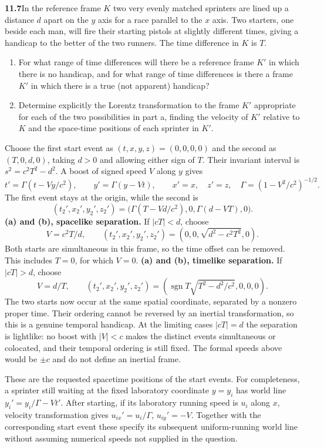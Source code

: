 \par\bigskip
\noindent\textbf{11.7}\quad In the reference frame $K$ two very evenly matched sprinters are lined up a distance $d$ apart on the $y$ axis for a race parallel to the $x$ axis. Two starters, one beside each man, will fire their starting pistols at slightly different times, giving a handicap to the better of the two runners. The time difference in $K$ is $T$.
\begin{enumerate}
\item[(a)] For what range of time differences will there be a reference frame $K'$ in which there is no handicap, and for what range of time differences is there a frame $K'$ in which there is a true (not apparent) handicap?
\item[(b)] Determine explicitly the Lorentz transformation to the frame $K'$ appropriate for each of the two possibilities in part a, finding the velocity of $K'$ relative to $K$ and the space-time positions of each sprinter in $K'$.
\end{enumerate}
\solution
Choose the first start event as $(t,x,y,z)=(0,0,0,0)$ and the
second as $(T,0,d,0)$, taking $d>0$ and allowing either sign of $T$.
Their invariant interval is
$s^2=c^2T^2-d^2$. A boost of signed speed $V$ along $y$ gives
\[
t'=\Gamma(t-Vy/c^2),\qquad y'=\Gamma(y-Vt),
\qquad x'=x,\quad z'=z,
\quad \Gamma=(1-V^2/c^2)^{-1/2}.
\]
The first event stays at the origin, while the second is
\[
(t_2',x_2',y_2',z_2')=
\bigl(\Gamma(T-Vd/c^2),0,\Gamma(d-VT),0\bigr).
\]
\textbf{(a) and (b), spacelike separation.} If $|cT|<d$, choose
\[
\boxed{V=c^2T/d,\qquad
(t_2',x_2',y_2',z_2')=(0,0,\sqrt{d^2-c^2T^2},0).}
\]
Both starts are simultaneous in this frame, so the time offset can
be removed. This includes $T=0$, for which $V=0$.
\textbf{(a) and (b), timelike separation.} If $|cT|>d$, choose
\[
\boxed{V=d/T,\qquad
(t_2',x_2',y_2',z_2')=
(\operatorname{sgn}T\sqrt{T^2-d^2/c^2},0,0,0).}
\]
The two starts now occur at the same spatial coordinate, separated
by a nonzero proper time. Their ordering cannot be reversed by an
inertial transformation, so this is a genuine temporal handicap.
At the limiting cases $|cT|=d$ the separation is lightlike: no boost
with $|V|<c$ makes the distinct events simultaneous or colocated,
and their temporal ordering is still fixed. The formal speeds above
would be $\pm c$ and do not define an inertial frame.

These are the requested spacetime positions of the start events.
For completeness, a sprinter still waiting at the fixed laboratory
coordinate $y=y_i$ has world line $y_i'=y_i/\Gamma-Vt'$.
After starting, if its laboratory running speed is $u_i$ along $x$,
velocity transformation gives $u_{ix}'=u_i/\Gamma$, $u_{iy}'=-V$.
Together with the corresponding start event these specify its
subsequent uniform-running world line without assuming numerical
speeds not supplied in the question.

